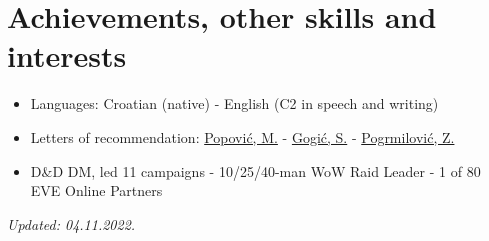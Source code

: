 \documentclass[a4paper]{article}
\newcommand{\bolditalicpair}
[2]
{\textbf{#1} \texorpdfstring{\hfill}{} \textit{#2}}
\begin{document}
\section{Achievements, other skills and interests}

\begin{itemize}
  \item Languages: Croatian (native) - English (C2 in speech and writing)
  \item Letters of recommendation: \href{https://github.com/MislavJaksic/CV/blob/master/LoR/AISoft_Popovic.pdf}{Popović, M.} - \href{https://github.com/MislavJaksic/CV/blob/master/LoR/Atos_Gogic.pdf}{Gogić, S.} - \href{https://github.com/MislavJaksic/CV/blob/master/LoR/Atos_Pogrmilovic.pdf}{Pogrmilović, Z.}
  \item D\&D DM, led 11 campaigns - 10/25/40-man WoW Raid Leader - 1 of 80 EVE Online Partners
\end{itemize}

\bolditalicpair{}{Updated: 04.11.2022.}
\end{document}
